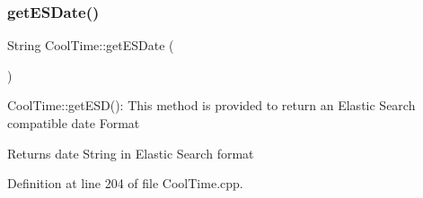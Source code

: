 \subsubsection{\texorpdfstring{get\+E\+S\+Date()}{getESDate()}}
{\footnotesize\ttfamily String Cool\+Time\+::get\+E\+S\+Date (\begin{DoxyParamCaption}{ }\end{DoxyParamCaption})}

Cool\+Time\+::get\+E\+S\+D()\+: This method is provided to return an Elastic Search compatible date Format

\begin{DoxyReturn}{Returns}
date String in Elastic Search format 
\end{DoxyReturn}


Definition at line 204 of file Cool\+Time.\+cpp.


